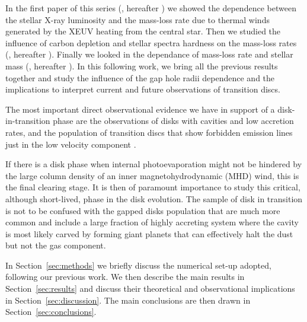 In the first paper of this series (\cite{2019MNRAS.487..691P}, hereafter ) we showed the dependence between the stellar X-ray luminosity and the mass-loss rate due to thermal winds generated by the XEUV heating from the central star. Then we studied the influence of carbon depletion \citep{2019MNRAS.490.5596W} and stellar spectra hardness on the mass-loss rates (\cite{2021MNRAS.508.1675E}, hereafter ). Finally we looked in the dependance of mass-loss rate and stellar mass (\cite{2021MNRAS.508.3611P}, hereafter ). In this following work, we bring all the previous results together and study the influence of the gap hole radii dependence and the implications to interpret current and future observations of transition discs.

The most important direct observational evidence we have in support of a disk-in-transition phase are the observations of disks with cavities and low accretion rates, and the population of transition discs that show forbidden emission lines just in the low velocity component \citep{2020ApJ...903...78P}.

If there is a disk phase when internal photoevaporation might not be hindered by the large column density of an inner magnetohydrodynamic (MHD) wind, this is the final clearing stage. It is then of paramount importance to study this critical, although short-lived, phase in the disk evolution.
The sample of disk in transition is not to be confused with the gapped disks population that are much more common and include a large fraction of highly accreting system where the cavity is most likely carved by forming giant planets that can effectively halt the dust but not the gas component.

In Section~\ref{sec:methods} we briefly discuss the numerical set-up adopted, following our previous work. We then describe the main results in Section~\ref{sec:results} and discuss their theoretical and observational implications in Section~\ref{sec:discussion}. The main conclusions are then drawn in Section~\ref{sec:conclusions}.
